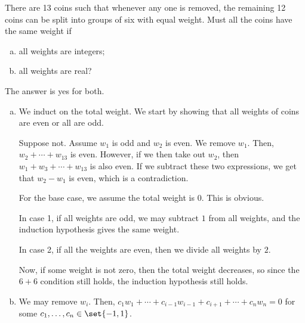 \documentclass[10pt]{mypackage}
\begin{document}
\begin{problem}
There are 13 coins such that whenever any one is removed, the remaining 12 coins can be split into groups of six with equal weight. Must all the coins have the same weight if
\begin{enumerate}[(a)]
  \item all weights are integers;
  \item all weights are real?
\end{enumerate}
\end{problem}
\begin{solution}
  The answer is yes for both.
  \begin{enumerate}[(a)]
    \item We induct on the total weight. We start by showing that all weights of coins are even or all are odd.\newline

      Suppose not. Assume $w_1$ is odd and $w_2$ is even. We remove $w_1$. Then, $w_2 + \cdots + w_{13}$ is even. However, if we then take out $w_2$, then $w_1 + w_3 + \cdots + w_{13}$ is also even. If we subtract these two expressions, we get that $w_2 - w_1$ is even, which is a contradiction.\newline

      For the base case, we assume the total weight is $0$. This is obvious.\newline

      In case 1, if all weights are odd, we may subtract $1$ from all weights, and the induction hypothesis gives the same weight.\newline

      In case 2, if all the weights are even, then we divide all weights by $2$.\newline

      Now, if some weight is not zero, then the total weight decreases, so since the $6+6$ condition still holds, the induction hypothesis still holds.
    \item We may remove $w_i$. Then, $c_1w_{1} + \cdots + c_{i-1}w_{i-1}+ c_{i+1} + \cdots + c_{n}w_n = 0$ for some $c_1,\dots,c_n\in \set{-1,1}$.\newline


\end{enumerate}
\end{solution}
\end{document}
